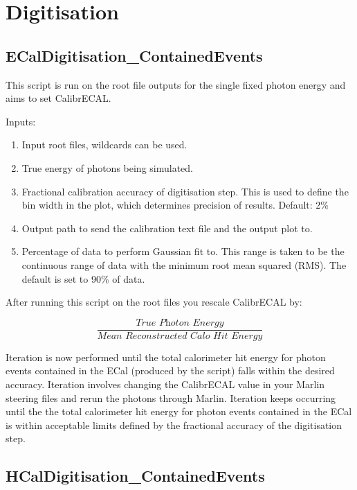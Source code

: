 \documentclass[11pt, oneside]{article}   	%
\begin{document}
\section{Digitisation}

\subsection{ECalDigitisation\_ContainedEvents}

This script is run on the root file outputs for the single fixed photon energy and aims to set CalibrECAL.

Inputs:
\begin{enumerate}
\item Input root files, wildcards can be used.
\item True energy of photons being simulated.
\item Fractional calibration accuracy of digitisation step.  This is used to define the bin width in the plot, which determines precision of results.  Default: 2\%
\item Output path to send the calibration text file and the output plot to.
\item Percentage of data to perform Gaussian fit to.  This range is taken to be the continuous range of data with the minimum root mean squared (RMS).  The default is set to 90\% of data.
\end{enumerate}

After running this script on the root files you rescale CalibrECAL by:

\begin{equation}
\frac{\textit{True Photon Energy}}{\textit{Mean Reconstructed Calo Hit Energy}}
\end{equation}

Iteration is now performed until the total calorimeter hit energy for photon events contained in the ECal (produced by the script) falls within the desired accuracy.  Iteration involves changing the CalibrECAL value in your Marlin steering files and rerun the photons through Marlin.  Iteration keeps occurring until the the total calorimeter hit energy for photon events contained in the ECal is within acceptable limits defined by the fractional accuracy of the digitisation step.

\subsection{HCalDigitisation\_ContainedEvents}
\end{document}
